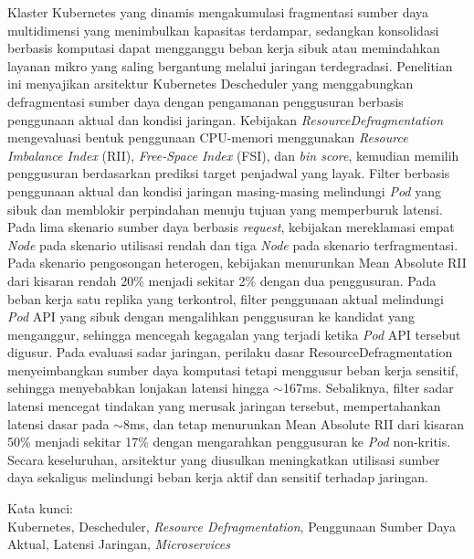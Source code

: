 Klaster Kubernetes yang dinamis mengakumulasi fragmentasi sumber daya multidimensi yang menimbulkan kapasitas terdampar, sedangkan konsolidasi berbasis komputasi dapat mengganggu beban kerja sibuk atau memindahkan layanan mikro yang saling bergantung melalui jaringan terdegradasi. Penelitian ini menyajikan arsitektur Kubernetes Descheduler yang menggabungkan defragmentasi sumber daya dengan pengamanan penggusuran berbasis penggunaan aktual dan kondisi jaringan. Kebijakan \textit{ResourceDefragmentation} mengevaluasi bentuk penggunaan CPU-memori menggunakan \textit{Resource Imbalance Index} (RII), \textit{Free-Space Index} (FSI), dan \textit{bin score}, kemudian memilih penggusuran berdasarkan prediksi target penjadwal yang layak. Filter berbasis penggunaan aktual dan kondisi jaringan masing-masing melindungi \textit{Pod} yang sibuk dan memblokir perpindahan menuju tujuan yang memperburuk latensi. Pada lima skenario sumber daya berbasis \textit{request}, kebijakan mereklamasi empat \textit{Node} pada skenario utilisasi rendah dan tiga \textit{Node} pada skenario terfragmentasi. Pada skenario pengosongan heterogen, kebijakan menurunkan Mean Absolute RII dari kisaran rendah 20\% menjadi sekitar 2\% dengan dua penggusuran. Pada beban kerja satu replika yang terkontrol, filter penggunaan aktual melindungi \textit{Pod} API yang sibuk dengan mengalihkan penggusuran ke kandidat yang menganggur, sehingga mencegah kegagalan yang terjadi ketika \textit{Pod} API tersebut digusur. Pada evaluasi sadar jaringan, perilaku dasar ResourceDefragmentation menyeimbangkan sumber daya komputasi tetapi menggusur beban kerja sensitif, sehingga menyebabkan lonjakan latensi hingga $\sim$167ms. Sebaliknya, filter sadar latensi mencegat tindakan yang merusak jaringan tersebut, mempertahankan latensi dasar pada $\sim$8ms, dan tetap menurunkan Mean Absolute RII dari kisaran 50\% menjadi sekitar 17\% dengan mengarahkan penggusuran ke \textit{Pod} non-kritis. Secara keseluruhan, arsitektur yang diusulkan meningkatkan utilisasi sumber daya sekaligus melindungi beban kerja aktif dan sensitif terhadap jaringan.

\vspace*{0.2cm}

\noindent Kata kunci: \\ Kubernetes, Descheduler, \textit{Resource Defragmentation}, Penggunaan Sumber Daya Aktual, Latensi Jaringan, \textit{Microservices} \\

\newpage
